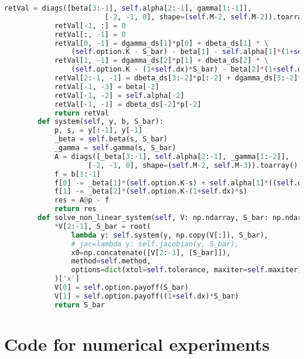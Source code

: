 \begin{lstlisting}[language=Python, caption=Implicit solver for Nielsen transformation]
            retVal = diags([beta[3:-1], self.alpha[2:-1], gamma[1:-1]],
                        [-2, -1, 0], shape=(self.M-2, self.M-2)).toarray()
            retVal[-1, :] = 0
            retVal[:, -1] = 0
            retVal[0, -1] = dgamma_ds[1]*p[0] + dbeta_ds[1] * \
                (self.option.K - S_bar) - beta[1] - self.alpha[1]*(1+self.dx)
            retVal[1, -1] = dgamma_ds[2]*p[1] + dbeta_ds[2] * \
                (self.option.K - (1+self.dx)*S_bar) - beta[2]*(1+self.dx)
            retVal[2:-1, -1] = dbeta_ds[3:-2]*p[:-2] + dgamma_ds[3:-2]*p[2:]
            retVal[-1, -3] = beta[-2]
            retVal[-1, -2] = self.alpha[-2]
            retVal[-1, -1] = dbeta_ds[-2]*p[-2]
            return retVal
        def system(self, y, b, S_bar):
            p, s, = y[:-1], y[-1]
            _beta = self.beta(s, S_bar)
            _gamma = self.gamma(s, S_bar)
            A = diags([_beta[3:-1], self.alpha[2:-1], _gamma[1:-2]],
                    [-2, -1, 0], shape=(self.M-2, self.M-3)).toarray()
            f = b[1:-1]
            f[0] -= _beta[1]*(self.option.K-s) + self.alpha[1]*((self.option.K-(1+self.dx)*s))
            f[1] -= _beta[2]*(self.option.K-(1+self.dx)*s)
            res = A@p - f
            return res
        def solve_non_linear_system(self, V: np.ndarray, S_bar: np.ndarray):
            *V[2:-1], S_bar = root(
                lambda y: self.system(y, np.copy(V[:]), S_bar),
                # jac=lambda y: self.jacobian(y, S_bar),
                x0=np.concatenate([V[2:-1], [S_bar]]),
                method=self.method,
                options=dict(xtol=self.tolerance, maxiter=self.maxiter)
            )['x']
            V[0] = self.option.payoff(S_bar)
            V[1] = self.option.payoff((1+self.dx)*S_bar)    
            return S_bar
\end{lstlisting}

\section{Code for numerical experiments} \label{sec:numericalexperiments}